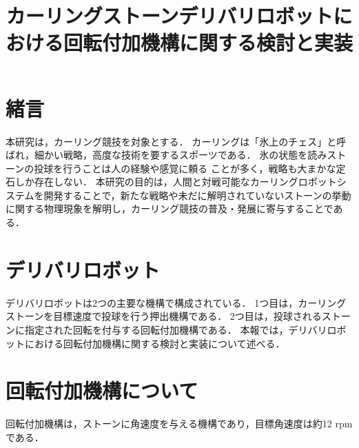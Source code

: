 \documentclass{classes/sice-si}
\title{カーリングストーンデリバリロボットにおける回転付加機構に関する検討と実装} %
\begin{document}


\maketitle

\section{緒言}
本研究は，カーリング競技を対象とする．
カーリングは「氷上のチェス」と呼ばれ，細かい戦略，高度な技術を要するスポーツである．
氷の状態を読みストーンの投球を行うことは人の経験や感覚に頼る
ことが多く，戦略も大まかな定石しか存在しない．
本研究の目的は，人間と対戦可能なカーリングロボットシステムを開発することで，新たな戦略や未だに解明されていないストーンの挙動に関する物理現象を解明し，カーリング競技の普及・発展に寄与することである．

\section{デリバリロボット}
デリバリロボットは2つの主要な機構で構成されている．
1つ目は，カーリングストーンを目標速度で投球を行う押出機構である．
2つ目は，投球されるストーンに指定された回転を付与する回転付加機構である．
本報では，デリバリロボットにおける回転付加機構に関する検討と実装について述べる．
\section{回転付加機構について}
回転付加機構は，ストーンに角速度を与える機構であり，目標角速度は約12 rpmである．
\end{document}
